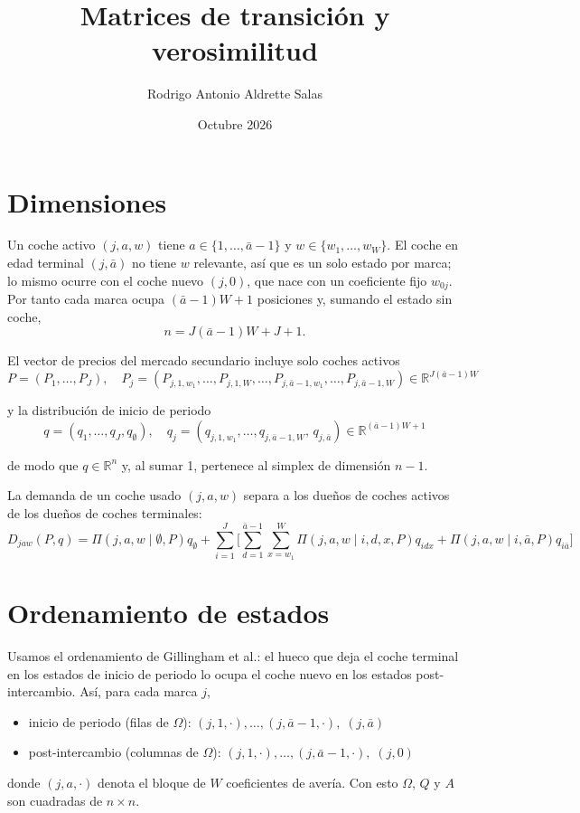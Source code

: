\documentclass{article}
\title{Matrices de transición y verosimilitud}
\author{Rodrigo Antonio Aldrette Salas}
\date{Octubre 2026}
\begin{document}
\maketitle


\section*{Dimensiones}

Un coche activo $(j,a,w)$ tiene $a\in\{1,\dots,\bar{a}-1\}$ y $w\in\{w_1,\dots,w_W\}$. El coche en edad terminal $(j,\bar{a})$ no tiene $w$ relevante, así que es un solo estado por marca; lo mismo ocurre con el coche nuevo $(j,0)$, que nace con un coeficiente fijo $w_{0j}$. Por tanto cada marca ocupa $(\bar{a}-1)W+1$ posiciones y, sumando el estado sin coche,
$$n=J(\bar{a}-1)W+J+1 .$$

El vector de precios del mercado secundario incluye solo coches activos
$$P=(P_1,\dots,P_J),\quad P_j=(P_{j,1,w_1},\dots,P_{j,1,W},\dots,P_{j,\bar{a}-1,w_1},\dots,P_{j,\bar{a}-1,W})\in\mathbb{R}^{J(\bar{a}-1)W}$$

y la distribución de inicio de periodo
$$q=(q_1,\dots,q_J,q_{\emptyset}),\quad q_j=(q_{j,1,w_1},\dots,q_{j,\bar{a}-1,W},\,q_{j,\bar{a}})\in\mathbb{R}^{(\bar{a}-1)W+1}$$

de modo que $q\in\mathbb{R}^{n}$ y, al sumar 1, pertenece al simplex de dimensión $n-1$.

La demanda de un coche usado $(j,a,w)$ separa a los dueños de coches activos de los dueños de coches terminales:
$$D_{jaw}(P,q)=\Pi(j,a,w\mid\emptyset,P)q_{\emptyset}+\sum_{i=1}^{J}\Big[\sum_{d=1}^{\bar{a}-1}\sum_{x=w_1}^{W}\Pi(j,a,w\mid i,d,x,P)q_{idx}+\Pi(j,a,w\mid i,\bar{a},P)q_{i\bar{a}}\Big]$$

\section*{Ordenamiento de estados}

Usamos el ordenamiento de Gillingham et al.: el hueco que deja el coche terminal en los estados de inicio de periodo lo ocupa el coche nuevo en los estados post-intercambio. Así, para cada marca $j$,
\begin{itemize}
    \item inicio de periodo (filas de $\Omega$): $(j,1,\cdot),\dots,(j,\bar{a}-1,\cdot),\;(j,\bar{a})$
    \item post-intercambio (columnas de $\Omega$): $(j,1,\cdot),\dots,(j,\bar{a}-1,\cdot),\;(j,0)$
\end{itemize}
donde $(j,a,\cdot)$ denota el bloque de $W$ coeficientes de avería. Con esto $\Omega$, $Q$ y $A$ son cuadradas de $n\times n$.
\end{document}
